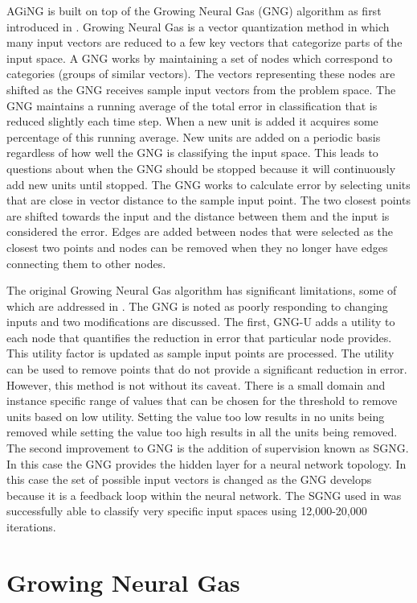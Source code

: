 \documentclass{article}
\renewcommand{\|}{\origbar} %
\begin{document}
AGiNG is built on top of the Growing Neural Gas (GNG) algorithm as first introduced in . Growing Neural Gas is a vector quantization method in which many input vectors are reduced to a few key vectors that categorize parts of the input space. A GNG works by maintaining a set of nodes which correspond to categories (groups of similar vectors). The vectors representing these nodes are shifted as the GNG receives sample input vectors from the problem space. The GNG maintains a running average of the total error in classification that is reduced slightly each time step. When a new unit is added it acquires some percentage of this running average. New units are added on a periodic basis regardless of how well the GNG is classifying the input space. This leads to questions about when the GNG should be stopped because it will continuously add new units until stopped. The GNG works to calculate error by selecting units that are close in vector distance to the sample input point. The two closest points are shifted towards the input and the distance between them and the input is considered the error. Edges are added between nodes that were selected as the closest two points and nodes can be removed when they no longer have edges connecting them to other nodes.

The original Growing Neural Gas algorithm has significant limitations, some of which are addressed in . The GNG is noted as poorly responding to changing inputs and two modifications are discussed. The first, GNG-U adds a utility to each node that quantifies the reduction in error that particular node provides. This utility factor is updated as sample input points are processed. The utility can be used to remove points that do not provide a significant reduction in error. However, this method is not without its caveat. There is a small domain and instance specific range of values that can be chosen for the threshold to remove units based on low utility. Setting the value too low results in no units being removed while setting the value too high results in all the units being removed. The second improvement to GNG is the addition of supervision known as SGNG. In this case the GNG provides the hidden layer for a neural network topology. In this case the set of possible input vectors is changed as the GNG develops because it is a feedback loop within the neural network. The SGNG used in  was successfully able to classify very specific input spaces using 12,000-20,000 iterations.

\section{Growing Neural Gas}
\label{sec:GNG}
\end{document}
